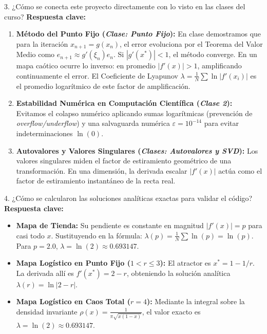 \documentclass[11pt,letterpaper]{article}
\begin{document}
\begin{pregunta}{3. ¿Cómo se conecta este proyecto directamente con lo visto en las clases del curso?}
\textbf{Respuesta clave:}
\begin{enumerate}
    \item \textbf{Método del Punto Fijo (\textit{Clase: Punto Fijo}):} En clase demostramos que para la iteración $x_{n+1} = g(x_n)$, el error evoluciona por el Teorema del Valor Medio como $e_{n+1} \approx g'(\xi_n) e_n$. Si $|g'(x^*)| < 1$, el método converge. En un mapa caótico ocurre lo inverso: en promedio $|f'(x)| > 1$, amplificando continuamente el error. El Coeficiente de Lyapunov $\lambda = \frac{1}{N} \sum \ln |f'(x_i)|$ es el promedio logarítmico de este factor de amplificación.
    \item \textbf{Estabilidad Numérica en Computación Científica (\textit{Clase 2}):} Evitamos el colapso numérico aplicando sumas logarítmicas (prevención de \textit{overflow/underflow}) y una salvaguarda numérica $\varepsilon = 10^{-14}$ para evitar indeterminaciones $\ln(0)$.
    \item \textbf{Autovalores y Valores Singulares (\textit{Clases: Autovalores y SVD}):} Los valores singulares miden el factor de estiramiento geométrico de una transformación. En una dimensión, la derivada escalar $|f'(x)|$ actúa como el factor de estiramiento instantáneo de la recta real.
\end{enumerate}
\end{pregunta}

\begin{pregunta}{4. ¿Cómo se calcularon las soluciones analíticas exactas para validar el código?}
\textbf{Respuesta clave:}
\begin{itemize}
    \item \textbf{Mapa de Tienda:} Su pendiente es constante en magnitud $|f'(x)| = p$ para casi todo $x$. Sustituyendo en la fórmula: $\lambda(p) = \frac{1}{N} \sum \ln(p) = \ln(p)$. Para $p=2.0$, $\lambda = \ln(2) \approx 0.693147$.
    \item \textbf{Mapa Logístico en Punto Fijo ($1 < r \le 3$):} El atractor es $x^* = 1 - 1/r$. La derivada allí es $f'(x^*) = 2 - r$, obteniendo la solución analítica $\lambda(r) = \ln|2 - r|$.
    \item \textbf{Mapa Logístico en Caos Total ($r=4$):} Mediante la integral sobre la densidad invariante $\rho(x) = \frac{1}{\pi\sqrt{x(1-x)}}$, el valor exacto es $\lambda = \ln(2) \approx 0.693147$.
\end{itemize}
\end{pregunta}
\end{document}
